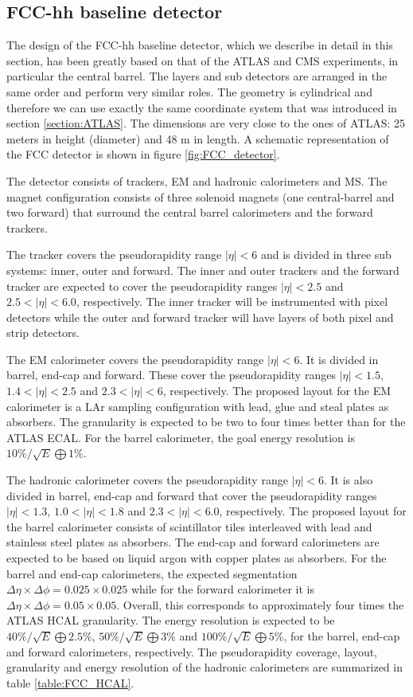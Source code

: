\subsection{FCC-hh baseline detector}
\label{section:FCC_detector}

The design of the FCC-hh baseline detector, which we describe in detail in this section, has been greatly based on that of the ATLAS and CMS experiments, in particular the central barrel. The layers and sub detectors are arranged in the same order and perform very similar roles. The geometry is cylindrical and therefore we can use exactly the same coordinate system that was introduced in section \ref{section:ATLAS}. The dimensions are very close to the ones of ATLAS: 25 meters in height (diameter) and 48 m in length. A schematic representation of the FCC detector is shown in figure \ref{fig:FCC_detector}.

The detector consists of trackers, EM and hadronic calorimeters and MS. The magnet configuration consists of three solenoid magnets (one central-barrel and two forward) that surround the central barrel calorimeters and the forward trackers.   

The tracker covers the pseudorapidity range $|\eta|<6$ and is divided in three sub systems: inner, outer and forward. The inner and outer trackers and the forward tracker are expected to cover the pseudorapidity ranges $|\eta|<2.5$ and $2.5<|\eta|<6.0$, respectively. The inner tracker will be instrumented with pixel detectors while the outer and forward tracker will have layers of both pixel and strip detectors. 

The EM calorimeter covers the pseudorapidity range $|\eta|<6$. It is divided in barrel, end-cap and forward. These cover the pseudorapidity ranges $|\eta|<1.5$, $1.4<|\eta|<2.5$ and $2.3<|\eta|<6$, respectively. The proposed layout for the EM calorimeter is a LAr sampling configuration with lead, glue and steal plates as absorbers. The granularity is expected to be two to four times better than for the ATLAS ECAL. For the barrel calorimeter, the goal energy resolution is $10\%/\sqrt{E}\bigoplus 1\%$.

The hadronic calorimeter covers the pseudorapidity range $|\eta|<6$. It is also divided in barrel, end-cap and forward that cover the pseudorapidity ranges $|\eta|<1.3$, $1.0<|\eta|<1.8$ and $2.3<|\eta|<6.0$, respectively. The proposed layout for the barrel calorimeter consists of scintillator tiles interleaved with lead and stainless steel plates as absorbers. The end-cap and forward calorimeters are expected to be based on liquid argon with copper plates as absorbers. For the barrel and end-cap calorimeters, the expected segmentation $\Delta\eta\times\Delta\phi=0.025\times 0.025$ while for the forward calorimeter it is $\Delta\eta\times\Delta\phi=0.05\times 0.05$. Overall, this corresponds to approximately four times the ATLAS HCAL granularity. The energy resolution is expected to be $40\%/\sqrt{E}\bigoplus 2.5\%$, $50\%/\sqrt{E}\bigoplus 3\%$ and $100\%/\sqrt{E}\bigoplus 5\%$, for the barrel, end-cap and forward calorimeters, respectively. The pseudorapidity coverage, layout, granularity and energy resolution of the hadronic calorimeters are summarized in table \ref{table:FCC_HCAL}.

